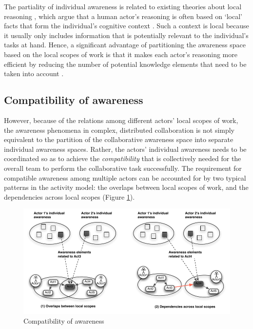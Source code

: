 The partiality of individual awareness is related to existing theories about local reasoning \cite{Benerecetti2000,ghidini2001local}, which argue that a human actor's reasoning is often based on `local' facts that form the individual's cognitive context \cite{Benerecetti2000}. Such a context is local because it usually only includes information that is potentially relevant to the individual's tasks at hand. Hence, a significant advantage of partitioning the awareness space based on the local scopes of work is that it makes each actor's reasoning more efficient by reducing the number of potential knowledge elements that need to be taken into account \cite{ghidini2001local}.  

\subsection{Compatibility of awareness} %
\label{sub:compatibility_of_awareness}
However, because of the relations among different actors' local scopes of work, the awareness phenomena in complex, distributed collaboration is not simply equivalent to the partition of the collaborative awareness space into separate individual awareness spaces. Rather, the actors' individual awareness needs to be coordinated so as to achieve the \emph{compatibility} that is collectively needed for the overall team to perform the collaborative task successfully. The requirement for compatible awareness among multiple actors can be accounted for by two typical patterns in the activity model: the overlaps between local scopes of work, and the dependencies across local scopes (Figure \ref{fig:compatibility_of_awareness}).

\begin{figure}[htbp] %
   \centering
   \includegraphics{compatibility_of_awareness.pdf} 
   \caption{Compatibility of awareness}
   \label{fig:compatibility_of_awareness}
\end{figure}

